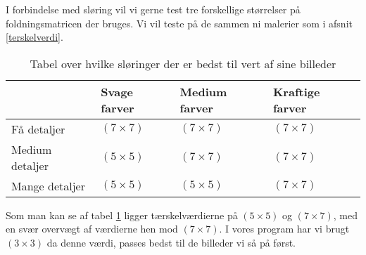 I forbindelse med sløring vil vi gerne test tre forskellige størrelser på foldningsmatricen der bruges. Vi vil teste
på de sammen ni malerier som i afsnit \ref{terskelverdi}.

\begin{table}[!h]
    \centering
    \begin{tabular}{| l | l | l | l |} \hline
                            & Svage farver	& Medium farver	& Kraftige farver 	\\ \hline
        Få detaljer 		& $(7 \times 7)$	& $(7 \times 7)$	& $(7 \times 7)$		\\ \hline
        Medium detaljer 	& $(5 \times 5)$	& $(7 \times 7)$	& $(7 \times 7)$		\\ \hline
        Mange detaljer		& $(5 \times 5)$	& $(5 \times 5)$	& $(7 \times 7)$		\\ \hline
    \end{tabular}
    \caption{Tabel over hvilke sløringer der er bedst til vert af sine billeder}
    \label{sloringTabel}
\end{table}

Som man kan se af tabel \ref{sloringTabel} ligger tærskelværdierne på
$(5 \times 5)$ og $(7 \times 7)$, med en svær overvægt af værdierne hen
mod $(7 \times 7)$. I vores program har vi brugt $(3 \times 3)$ da denne
værdi, passes bedst til de billeder vi så på først. 

